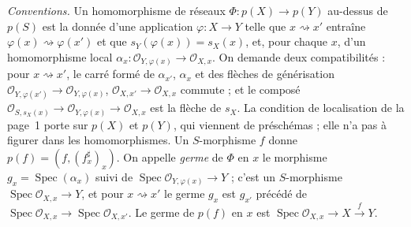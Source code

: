 \noindent\emph{Conventions.} Un homomorphisme de réseaux $\Phi : p(X) \to p(Y)$ au-dessus de $p(S)$ est la donnée d'une application $\varphi : X \to Y$ telle que $x \rightsquigarrow x'$ entraîne $\varphi(x) \rightsquigarrow \varphi(x')$ et que $s_Y(\varphi(x)) = s_X(x)$, et, pour chaque $x$, d'un homomorphisme local $\alpha_x : \mathcal O_{Y,\varphi(x)} \to \mathcal O_{X,x}$. On demande deux compatibilités : pour $x \rightsquigarrow x'$, le carré formé de $\alpha_{x'}$, $\alpha_x$ et des flèches de générisation $\mathcal O_{Y,\varphi(x')} \to \mathcal O_{Y,\varphi(x)}$, $\mathcal O_{X,x'} \to \mathcal O_{X,x}$ commute ; et le composé $\mathcal O_{S,s_X(x)} \to \mathcal O_{Y,\varphi(x)} \to \mathcal O_{X,x}$ est la flèche de $s_X$. La condition de localisation de la page~1 porte sur $p(X)$ et $p(Y)$, qui viennent de préschémas ; elle n'a pas à figurer dans les homomorphismes. Un $S$-morphisme $f$ donne $p(f) = (f, (f^\sharp_x)_x)$. On appelle \emph{germe} de $\Phi$ en $x$ le morphisme $g_x = \operatorname{Spec}(\alpha_x)$ suivi de $\operatorname{Spec} \mathcal O_{Y,\varphi(x)} \to Y$ ; c'est un $S$-morphisme $\operatorname{Spec} \mathcal O_{X,x} \to Y$, et pour $x \rightsquigarrow x'$ le germe $g_x$ est $g_{x'}$ précédé de $\operatorname{Spec} \mathcal O_{X,x} \to \operatorname{Spec} \mathcal O_{X,x'}$. Le germe de $p(f)$ en $x$ est $\operatorname{Spec} \mathcal O_{X,x} \to X \xrightarrow{f} Y$.

